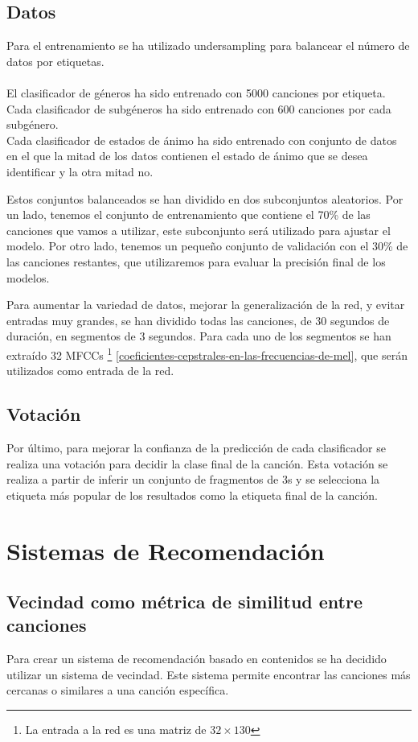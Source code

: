 \subsection{Datos}

Para el entrenamiento se ha utilizado undersampling para balancear el número de datos por etiquetas.\\
\\
El clasificador de géneros ha sido entrenado con 5000 canciones por etiqueta. \\
Cada clasificador de subgéneros ha sido entrenado con 600 canciones por cada subgénero. \\
Cada clasificador de estados de ánimo ha sido entrenado con conjunto de datos en el que la mitad de los datos contienen el estado de ánimo que se desea identificar y la otra mitad no.

Estos conjuntos balanceados se han dividido en dos subconjuntos aleatorios. Por un lado, tenemos el conjunto de entrenamiento que contiene el 70\% de las canciones que vamos a utilizar, este subconjunto será utilizado para ajustar el modelo. Por otro lado, tenemos un pequeño conjunto de validación con el 30\% de las canciones restantes, que utilizaremos para evaluar la precisión final de los modelos.

Para aumentar la variedad de datos, mejorar la generalización de la red, y evitar entradas muy grandes, se han dividido todas las canciones, de 30 segundos de duración, en segmentos de 3 segundos.
Para cada uno de los segmentos se han extraído 32 MFCCs \footnote{La entrada a la red es una matriz de $32\times130$} \ref{coeficientes-cepstrales-en-las-frecuencias-de-mel}, que serán utilizados como entrada de la red. 


\subsection{Votación}
Por último, para mejorar la confianza de la predicción de cada clasificador se realiza una votación para decidir la clase final de la canción. Esta votación se realiza a partir de inferir un conjunto de fragmentos de 3s y se selecciona la etiqueta más popular de los resultados como la etiqueta final de la canción. 


\section{Sistemas de Recomendación} \label{recomend_contenido}
\subsection{Vecindad como métrica de similitud entre canciones}
Para crear un sistema de recomendación basado en contenidos se ha decidido utilizar un sistema de vecindad. Este sistema permite encontrar las canciones más cercanas o similares a una canción específica.


